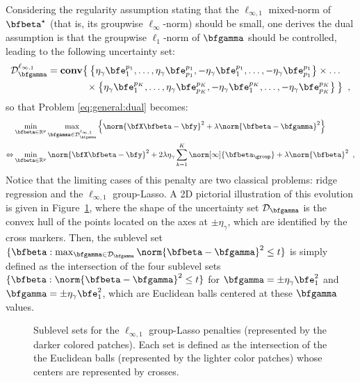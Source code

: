 %
\else
Considering the regularity assumption stating that the $\ell_{\infty,1}$
mixed-norm of $\bfbeta^\star$ (that is, its groupwise $\ell_\infty$-norm) should
be small, one derives the dual assumption is that the groupwise $\ell_1$-norm of
$\bfgamma$ should be controlled, leading to the following uncertainty set:
%
\begin{align*}
  \mathcal{D}^{\ell_{\infty,1}}_{\bfgamma} & = \mathbf{conv} \big\{ 
                        \left\{\eta_\gamma\bfe^{p_1}_1, \ldots, \eta_\gamma\bfe^{p_1}_{p_1},-\eta_\gamma\bfe^{p_1}_1, \ldots, -\eta_\gamma\bfe^{p_1}_{p_1} \right\} 
                        \times \ldots \\
    & \hspace*{4em} \times 
                        \left\{\eta_\gamma\bfe^{p_K}_1, \ldots, \eta_\gamma\bfe^{p_K}_{p_K},-\eta_\gamma\bfe^{p_K}_1, \ldots, -\eta_\gamma\bfe^{p_K}_{p_K} \right\} 
                      \big\}
  \enspace,
\end{align*}
so that Problem \eqref{eq:general:dual} becomes:
%
\begin{align*}
  & \min_{\bfbeta\in\mathbb{R}^p} \max_{\bfgamma \in \mathcal{D}^{\ell_{\infty,1}}_{\bfgamma}}
      \Big\{ \norm{\bfX \bfbeta - \bfy}^2 + \lambda \norm{\bfbeta - \bfgamma}^2 \Big\} \\
  \Leftrightarrow
    & \min_{\bfbeta\in\mathbb{R}^p}
      \norm{\bfX \bfbeta - \bfy}^2 + 2 \lambda \eta_\gamma \sum_{k=1}^K \norm[\infty]{\bfbeta_{\group}} + \lambda \norm{\bfbeta}^2 
  \enspace,
\end{align*}
%
\fi
Notice that the limiting cases of this penalty are two classical problems: ridge
regression and the $\ell_{\infty,1}$ group-Lasso.
A 2D pictorial illustration of this evolution is given in
Figure~\ref{fig:group-penalty}, where the shape of the uncertainty set
$\mathcal{D}_{\bfgamma}$ is the convex hull of the points located on the axes at $\pm
\eta_\gamma$, which are identified by the cross markers.
Then, the sublevel set 
$\{\bfbeta : \max_{\bfgamma \in \mathcal{D}_{\bfgamma}} \norm{\bfbeta-\bfgamma}^2 \leq t\}$
is simply defined as the intersection of the four sublevel sets
$\{\bfbeta : \norm{\bfbeta - \bfgamma}^2 \leq t\}$ for 
$\bfgamma=\pm \eta_\gamma\bfe^{2}_1$ and $\bfgamma=\pm \eta_\gamma\bfe^{2}_1$,
which are Euclidean balls centered at these $\bfgamma$ values.
%
\begin{figure}
  \begin{center} 
    \caption{Sublevel sets for the $\ell_{\infty,1}$ group-Lasso penalties
             (represented by the darker colored patches).
             Each set is defined as the intersection of the the Euclidean balls
             (represented by the lighter color patches) whose centers are
             represented by crosses.}
    \label{fig:group-penalty}
    \end{center} 
\end{figure}

